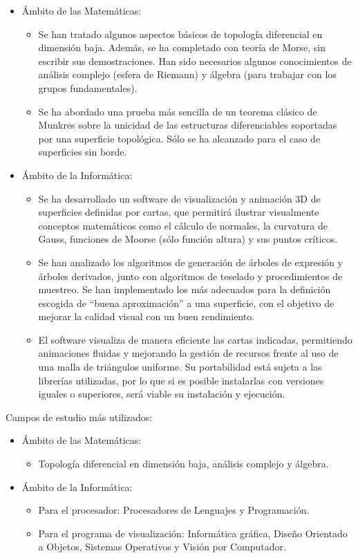 \begin{itemize}
	\item Ámbito de las Matemáticas:
	\begin{itemize}
		\item Se han tratado algunos aspectos básicos de topología diferencial en dimensión baja. Además, se ha completado con teoría de Morse, sin escribir sus demostraciones. Han sido necesarios algunos conocimientos de análisis complejo (esfera de Riemann) y álgebra (para trabajar con los grupos fundamentales).
		\item Se ha abordado una prueba más sencilla de un teorema clásico de Munkres sobre la unicidad de las estructuras diferenciables soportadas por una superficie topológica. Sólo se ha alcanzado para el caso de superficies sin borde.
	\end{itemize}
	\item Ámbito de la Informática:
	\begin{itemize}
		\item Se ha desarrollado un software de visualización y animación $3$D de superficies definidas por cartas, que permitirá ilustrar visualmente conceptos matemáticos como el cálculo de normales, la curvatura de Gauss, funciones de Moorse (sólo función altura) y sus puntos críticos.
		\item Se han analizado los algoritmos de generación de árboles de expresión y árboles derivados, junto con algoritmos de teselado y procedimientos de muestreo. Se han implementado los más adecuados para la definición escogida de ``buena aproximación'' a una superficie, con el objetivo de mejorar la calidad visual con un buen rendimiento.
		\item El software visualiza de manera eficiente las cartas indicadas, permitiendo animaciones fluidas y mejorando la gestión de recursos frente al uso de una malla de triángulos uniforme. Su portabilidad está sujeta a las librerías utilizadas, por lo que si es posible instalarlas con versiones iguales o superiores, será viable su instalación y ejecución.
	\end{itemize}
\end{itemize}
Campos de estudio más utilizados:
\begin{itemize}
	\item Ámbito de las Matemáticas:
	\begin{itemize}
		\item Topología diferencial en dimensión baja, análisis complejo y álgebra.
	\end{itemize}
	\item Ámbito de la Informática:
	\begin{itemize}
		\item Para el procesador: Procesadores de Lenguajes y Programación.
		\item Para el programa de visualización: Informática gráfica, Diseño Orientado a Objetos, Sistemas Operativos y Visión por Computador.
	\end{itemize}
\end{itemize}

\endinput
